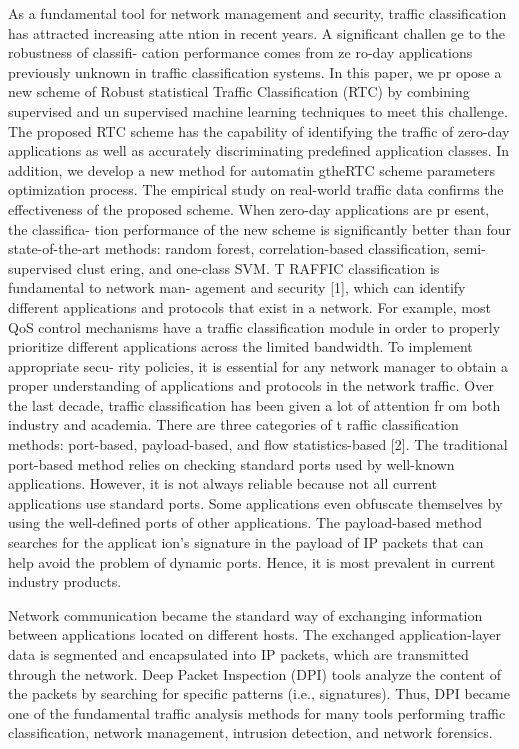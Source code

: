 \documentclass[10pt,journal,compsoc]{IEEEtran}
\begin{document}
\cite{Zhang2014}
As a fundamental tool for network management and
security, traffic classification has attracted increasing atte
ntion in
recent years. A significant challen
ge to the robustness of classifi-
cation performance comes from ze
ro-day applications previously
unknown in traffic classification systems. In this paper, we pr
opose
a new scheme of Robust statistical Traffic Classification (RTC)
by  combining  supervised  and  un
supervised  machine  learning
techniques to meet this challenge. The proposed RTC
scheme has
the capability of identifying the traffic of zero-day applications as
well as accurately discriminating predefined application classes.
In addition, we develop a new method for automatin
gtheRTC
scheme parameters optimization process. The empirical study on
real-world traffic data confirms the effectiveness of the proposed
scheme. When zero-day applications are pr
esent, the classifica-
tion performance of the new scheme is significantly better than
four state-of-the-art methods: random forest, correlation-based
classification, semi-supervised clust
ering, and one-class SVM.
T
RAFFIC classification is fundamental to network man-
agement and security [1], which can identify different
applications and protocols that exist in a network. For example,
most QoS control mechanisms have a traffic classification
module in order to properly prioritize different applications
across the limited bandwidth. To implement appropriate secu-
rity policies, it is essential for any network manager to obtain
a proper understanding of applications and protocols in the
network traffic. Over the last decade, traffic classification has
been given a lot of attention fr
om both industry and academia.
There are three categories of t
raffic classification methods:
port-based, payload-based, and
flow statistics-based [2]. The
traditional port-based method relies on checking standard ports
used by well-known applications. However, it is not always
reliable because not all current applications use standard ports.
Some applications even obfuscate themselves by using the
well-defined ports of other applications. The payload-based
method searches for the applicat
ion's signature in the payload
of IP packets that can help avoid the problem of dynamic
ports. Hence, it is most prevalent in current industry products.
%

\cite{Bujlow2015}
Network communication became the standard way of
exchanging information between applications located on
different hosts. The exchanged application-layer data is
segmented and encapsulated into IP packets, which are
transmitted through the network. Deep Packet Inspection
(DPI) tools analyze the content of the packets by searching
for specific patterns (i.e., signatures). Thus, DPI became one
of the fundamental traffic analysis methods for many tools
performing traffic classification, network management,
intrusion detection, and network forensics.
\end{document}
